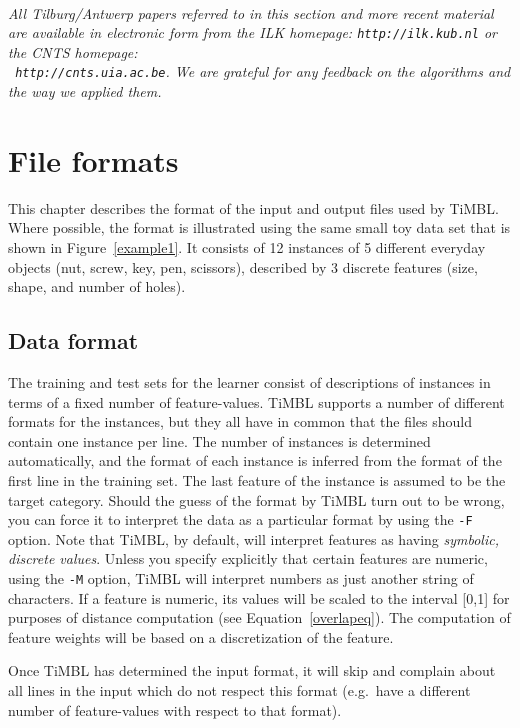 \documentclass{report}
\begin{document}
\ \\

{\it All Tilburg/Antwerp papers referred to in this section and more recent
material are available in electronic form from the {\sc ILK} homepage:
{\tt http://ilk.kub.nl} or the {\sc CNTS} homepage: \\ {\tt
http://cnts.uia.ac.be}. We are grateful for any feedback on the
algorithms and the way we applied them.}

\chapter{File formats}
\label{fileformats}

This chapter describes the format of the input and output files used
by TiMBL. Where possible, the format is illustrated using the same
small toy data set that is shown in Figure~\ref{example1}. It consists
of 12 instances of 5 different everyday objects (nut, screw, key, pen,
scissors), described by 3 discrete features (size, shape, and number
of holes).

\section{Data format}
\label{dataformats}

The training and test sets for the learner consist of descriptions of
instances in terms of a fixed number of feature-values. TiMBL supports
a number of different formats for the instances, but they all have in
common that the files should contain one instance per line. The number
of instances is determined automatically, and the format of each
instance is inferred from the format of the first line in the training
set. The last feature of the instance is assumed to be the target
category. Should the guess of the format by TiMBL turn out to be
wrong, you can force it to interpret the data as a particular format
by using the {\tt -F} option. Note that TiMBL, by default, will
interpret features as having {\em symbolic, discrete values}. Unless
you specify explicitly that certain features are numeric, using the
{\tt -M} option, TiMBL will interpret numbers as just another string
of characters. If a feature is numeric, its values will be scaled to
the interval [0,1] for purposes of distance computation (see
Equation~\ref{overlapeq}). The computation of feature weights will be
based on a discretization of the feature.

Once TiMBL has determined the input format, it will skip and complain
about all lines in the input which do not respect this format
(e.g.~have a different number of feature-values with respect to that
format).
\end{document}
